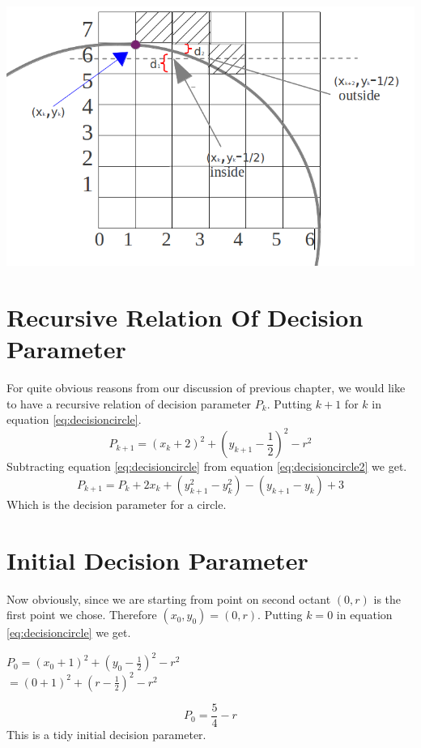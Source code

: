\documentclass[a4paper,12pt,oneside]{book}
\begin{document}
  \includegraphics[scale=0.50]{Files/Images/CirclePoint.png}
\section{Recursive Relation Of Decision Parameter}
For quite obvious reasons from our discussion of previous chapter, we would like to have a recursive relation of decision parameter $P_k$. Putting $k+1$ for $k$ in equation \ref{eq:decisioncircle}.
\begin{equation} \label{eq:decisioncircle2}
	P_{k+1}=(x_k+2)^2+\left(y_{k+1}-\frac{1}{2}\right)^2-r^2
\end{equation}
Subtracting equation \ref{eq:decisioncircle} from equation \ref{eq:decisioncircle2} we get.
\begin{equation} \label{eq:circlerecursivep}
	P_{k+1}=P_k+2x_k+(y_{k+1}^2-y_k^2)-(y_{k+1}-y_k)+3
\end{equation}
 Which is the decision parameter for a circle.
 \section{Initial Decision Parameter}
 Now obviously, since we are starting from point on second octant $(0,r)$ is the first point we chose. Therefore $(x_0,y_0)=(0,r)$. Putting $k=0$ in equation \ref{eq:decisioncircle} we get.
 \begin{center}
 	$P_0=(x_0+1)^2+(y_0-\frac{1}{2})^2-r^2$\\
	$=(0+1)^2+(r-\frac{1}{2})^2-r^2$ 	
 \end{center}
 \begin{equation} \label{eq:p0circle}
	P_0=\frac{5}{4}-r
 \end{equation}
 This is a tidy initial decision parameter.\\
\end{document}
